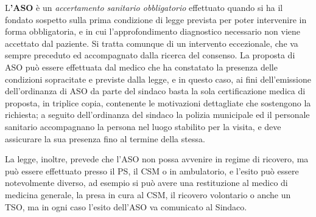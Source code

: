 L\textbf{'ASO} è un \emph{accertamento sanitario obbligatorio}
effettuato quando si ha il fondato sospetto sulla prima condizione di
legge prevista per poter intervenire in forma obbligatoria, e in cui
l'approfondimento diagnostico necessario non viene accettato dal
paziente. Si tratta comunque di un intervento eccezionale, che va sempre
preceduto ed accompagnato dalla ricerca del consenso. La proposta di ASO
può essere effettuata dal medico che ha constatato la presenza delle
condizioni sopracitate e previste dalla legge, e in questo caso, ai fini
dell'emissione dell'ordinanza di ASO da parte del sindaco basta la sola
certificazione medica di proposta, in triplice copia, contenente le
motivazioni dettagliate che sostengono la richiesta; a seguito
dell'ordinanza del sindaco la polizia municipale ed il personale
sanitario accompagnano la persona nel luogo stabilito per la visita, e
deve assicurare la sua presenza fino al termine della stessa.

La legge, inoltre, prevede che l'ASO non possa avvenire in regime di
ricovero, ma può essere effettuato presso il PS, il CSM o in
ambulatorio, e l'esito può essere notevolmente diverso, ad esempio si
può avere una restituzione al medico di medicina generale, la presa in
cura al CSM, il ricovero volontario o anche un TSO, ma in ogni caso
l'esito dell'ASO va comunicato al Sindaco.
